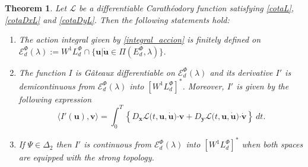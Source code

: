 \documentclass[twoside]{elsarticle}
\newtheorem{thm}{Theorem}[section]
\theoremstyle{remark}
\newcommand{\lphi}{L^{\Phi}}
\newcommand{\ephi}{E^{\Phi}}
\newcommand{\wphi}{W^{1}\lphi}
\newcommand{\domi}{\mathcal{E}^{\Phi}_d(\lambda)}
\renewcommand{\b}[1]{\boldsymbol{#1}}
\newcommand{\ccdot}{\b{\cdot}}
\begin{document}
\begin{thm}\label{teorema_acotacion}
Let $\mathcal{L}$ be a differentiable Carath\'eodory function satisfying \eqref{cotaL}, \eqref{cotaDxL} and \eqref{cotaDyL}. 
Then the following statements hold:
\begin{enumerate}
\item \label{T1item1} \label{A1} The action integral given by \eqref{integral_accion}
is finitely defined on $\domi:=W^{1}\lphi_d\cap\{\b{u}|\b{\dot{u}}\in\Pi(\ephi_d,\lambda)\}$.

\item\label{T1item3} The function  $I$ is G\^ateaux differentiable on $\domi$ and  its derivative $I'$ is demicontinuous from $\domi$  into $\left[\wphi_d \right]^*$. Moreover, $I'$ is given by the following expression
\begin{equation}\label{DerAccion}
\langle  I'(\b{u}),\b{v}\rangle= \int_0^T \left\{D_{\b{x}}\mathcal{L}\big(t,\b{u},\b{\dot{u}}\big)\ccdot \b{v}+ D_{\b{y}}\mathcal{L}\big(t,\b{u},\b{\dot{u}}\big)\ccdot\b{\dot{v}}\right\} \ dt.
\end{equation}

\item\label{T1item4}  If  $\Psi \in \Delta_2$ then 
  $I'$ is continuous from $\domi$ into $\left[\wphi_d\right]^*$ when both spaces are equipped with the strong topology.


\end{enumerate}
\end{thm}
\end{document}
